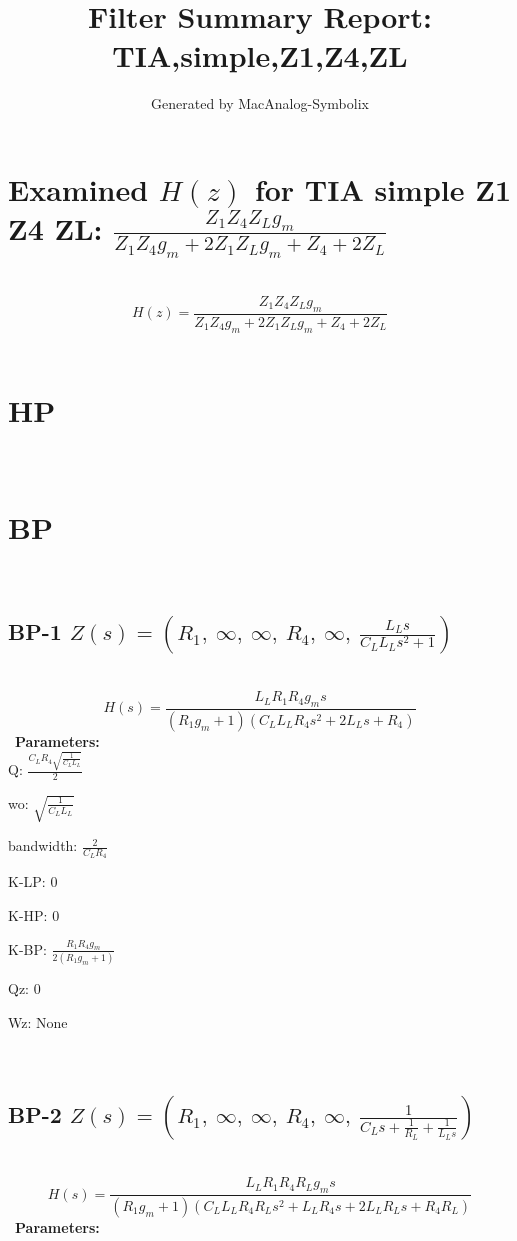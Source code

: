 \documentclass{article}
\begin{document}
        
                        \title{Filter Summary Report: TIA,simple,Z1,Z4,ZL}
                        \author{Generated by MacAnalog-Symbolix}
                        \maketitle

                        \tableofcontents
                        \newpage
                        \section{Examined $H(z)$ for TIA simple Z1 Z4 ZL: $\frac{Z_{1} Z_{4} Z_{L} g_{m}}{Z_{1} Z_{4} g_{m} + 2 Z_{1} Z_{L} g_{m} + Z_{4} + 2 Z_{L}}$ }\ 
\textbf{\[H(z) = \frac{Z_{1} Z_{4} Z_{L} g_{m}}{Z_{1} Z_{4} g_{m} + 2 Z_{1} Z_{L} g_{m} + Z_{4} + 2 Z_{L}}\] }\ 
\section{HP}\ 
\section{BP}\ 
\subsection{BP-1 $Z(s) = \left( R_{1}, \  \infty, \  \infty, \  R_{4}, \  \infty, \  \frac{L_{L} s}{C_{L} L_{L} s^{2} + 1}\right)$ } \ 
\textbf{\[H(s) = \frac{L_{L} R_{1} R_{4} g_{m} s}{\left(R_{1} g_{m} + 1\right) \left(C_{L} L_{L} R_{4} s^{2} + 2 L_{L} s + R_{4}\right)}\] } \ 
\textbf{Parameters:}\\ 

Q: $\frac{C_{L} R_{4} \sqrt{\frac{1}{C_{L} L_{L}}}}{2}$\ 

wo: $\sqrt{\frac{1}{C_{L} L_{L}}}$\ 

bandwidth: $\frac{2}{C_{L} R_{4}}$\ 

K-LP: $0$\ 

K-HP: $0$\ 

K-BP: $\frac{R_{1} R_{4} g_{m}}{2 \left(R_{1} g_{m} + 1\right)}$\ 

Qz: $0$\ 

Wz: $\text{None}$\ 

\ 

\subsection{BP-2 $Z(s) = \left( R_{1}, \  \infty, \  \infty, \  R_{4}, \  \infty, \  \frac{1}{C_{L} s + \frac{1}{R_{L}} + \frac{1}{L_{L} s}}\right)$ } \ 
\textbf{\[H(s) = \frac{L_{L} R_{1} R_{4} R_{L} g_{m} s}{\left(R_{1} g_{m} + 1\right) \left(C_{L} L_{L} R_{4} R_{L} s^{2} + L_{L} R_{4} s + 2 L_{L} R_{L} s + R_{4} R_{L}\right)}\] } \ 
\textbf{Parameters:}\\ 
\end{document}
